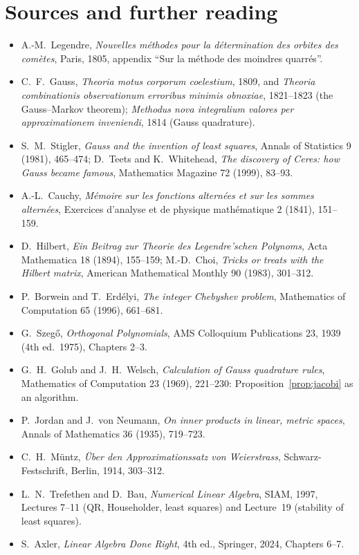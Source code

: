 \section*{Sources and further reading}

\begin{itemize}
\item A.-M.~Legendre, \emph{Nouvelles m\'ethodes pour la d\'etermination des orbites des com\`etes}, Paris, 1805, appendix
``Sur la m\'ethode des moindres quarr\'es''.
\item C.~F.~Gauss, \emph{Theoria motus corporum coelestium}, 1809, and \emph{Theoria combinationis observationum erroribus
minimis obnoxiae}, 1821--1823 (the Gauss--Markov theorem); \emph{Methodus nova integralium valores per approximationem
inveniendi}, 1814 (Gauss quadrature).
\item S.~M.~Stigler, \emph{Gauss and the invention of least squares}, Annals of Statistics 9 (1981), 465--474; D.~Teets and
K.~Whitehead, \emph{The discovery of Ceres: how Gauss became famous}, Mathematics Magazine 72 (1999), 83--93.
\item A.-L.~Cauchy, \emph{M\'emoire sur les fonctions altern\'ees et sur les sommes altern\'ees}, Exercices d'analyse et de
physique math\'ematique 2 (1841), 151--159.
\item D.~Hilbert, \emph{Ein Beitrag zur Theorie des Legendre'schen Polynoms}, Acta Mathematica 18 (1894), 155--159;
M.-D.~Choi, \emph{Tricks or treats with the Hilbert matrix}, American Mathematical Monthly 90 (1983), 301--312.
\item P.~Borwein and T.~Erd\'elyi, \emph{The integer Chebyshev problem}, Mathematics of Computation 65 (1996), 661--681.
\item G.~Szeg\H{o}, \emph{Orthogonal Polynomials}, AMS Colloquium Publications 23, 1939 (4th ed.\ 1975), Chapters 2--3.
\item G.~H.~Golub and J.~H.~Welsch, \emph{Calculation of Gauss quadrature rules}, Mathematics of Computation 23 (1969),
221--230: Proposition~\ref{prop:jacobi} as an algorithm.
\item P.~Jordan and J.~von Neumann, \emph{On inner products in linear, metric spaces}, Annals of Mathematics 36 (1935),
719--723.
\item C.~H.~M\"untz, \emph{\"Uber den Approximationssatz von Weierstrass}, Schwarz-Festschrift, Berlin, 1914, 303--312.
\item L.~N.~Trefethen and D.~Bau, \emph{Numerical Linear Algebra}, SIAM, 1997, Lectures 7--11 (QR, Householder, least
squares) and Lecture~19 (stability of least squares).
\item S.~Axler, \emph{Linear Algebra Done Right}, 4th ed., Springer, 2024, Chapters 6--7.
\end{itemize}
